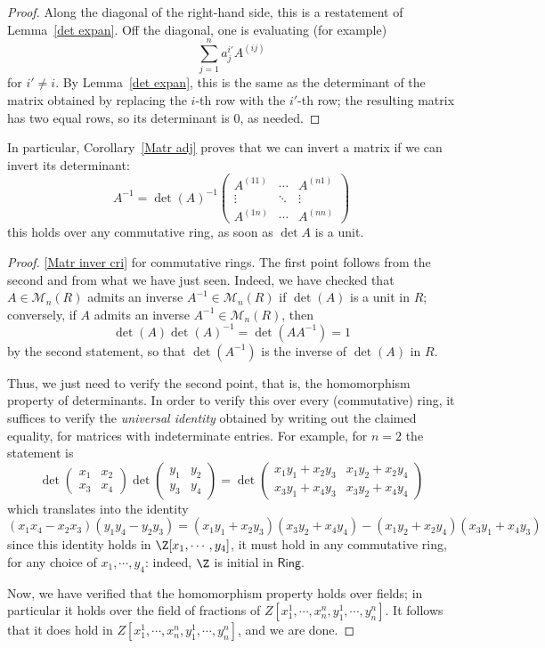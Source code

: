 \begin{proof}
Along the diagonal of the right-hand side, this is a restatement of Lemma~\ref{det expan}. Off the diagonal, one is evaluating (for example)
\[\sum_{j=1}^{n}a^{i'}_jA^{(ij)}\]
for $i'\neq i$. By Lemma~\ref{det expan}, this is the same as the determinant of the matrix obtained
by replacing the $i$-th row with the $i'$-th row; the resulting matrix has two equal rows, so its determinant is $0$, as needed.
\end{proof}
In particular, Corollary~\ref{Matr adj} proves that we can invert a matrix if we can invert its determinant:
\[A^{-1}=\det(A)^{-1}\begin{pmatrix}
A^{(11)}&\cdots& A^{(n1)}\\
\vdots&\ddots&\vdots\\
A^{(1n)}&\cdots&A^{(nn)}
\end{pmatrix}\]
this holds over any commutative ring, as soon as $\det A$ is a unit.
\begin{proof}\ref{Matr inver cri} for commutative rings. The first point follows from the second and from what we have just seen. Indeed, we have checked that $A\in\mathcal{M}_n(R)$ admits an inverse $A^{-1}\in\mathcal{M}_n(R)$ if $\det(A)$ is a unit in $R$; conversely, if $A$ admits an inverse $A^{-1}\in\mathcal{M}_n(R)$, then
\[\det(A)\det(A)^{-1}=\det(AA^{-1})=1\]
by the second statement, so that $\det(A^{-1})$ is the inverse of $\det(A)$ in $R$.\par
Thus, we just need to verify the second point, that is, the homomorphism property of determinants. In order to verify this over every (commutative) ring, it suffices to verify the \textit{universal identity} obtained by writing out the claimed equality, for matrices with indeterminate entries. For example, for $n=2$ the statement is 
\[\det\begin{pmatrix}
x_1&x_2\\
x_3&x_4
\end{pmatrix}\det\begin{pmatrix}
y_1&y_2\\
y_3&y_4
\end{pmatrix}=\det\begin{pmatrix}
x_1y_1+x_2y_3&x_1y_2+x_2y_4\\
x_3y_1+x_4y_3&x_3y_2+x_4y_4
\end{pmatrix}\]
which translates into the identity
\[(x_1x_4-x_2x_3)(y_1y_4-y_2y_3)=(x_1y_1+x_2y_3)(x_3y_2+x_4y_4)-(x_1y_2+x_2y_4)(x_3y_1+x_4y_3)\]
since this identity holds in $\Z[x_1,\cdots,y_4]$, it must hold in any commutative ring, for any choice of $x_1,\cdots,y_4$: indeed, $\Z$ is initial in $\mathsf{Ring}$.\par
Now, we have verified that the homomorphism property holds over fields; in particular it holds over the field of fractions of $Z[x^1_1,\cdots,x^n_n,y^1_1,\cdots,y^n_n]$. It follows that it does hold in $Z[x^1_1,\cdots,x^n_n,y^1_1,\cdots,y^n_n]$, and we are done.
\end{proof}
